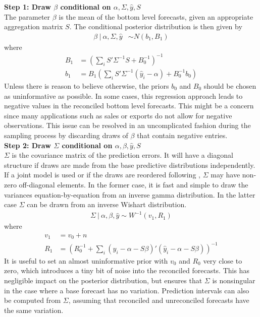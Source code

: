 \documentclass[a4paper,fleqn,11pt]{article}
\begin{document}
\noindent\textbf{Step 1: Draw $\beta$ conditional on $\alpha,\Sigma,\hat{y},S$}\\
The parameter $\beta$ is the mean of the bottom level forecasts, given an appropriate aggregation matrix $S$. The conditional posterior distribution is then given by
\begin{align}
\beta\ |\ \alpha,\Sigma,\hat{y} &\sim N(b_1,B_1)
\end{align}
where
\begin{align*}
B_1 &= \left(\sum_i S'\Sigma^{-1}S + B_0^{-1}\right)^{-1} \\
b_1 &= B_1 \left(\sum_i S'\Sigma^{-1} (\hat{y}_i - \alpha) + B_0^{-1}b_0\right)
\end{align*}
Unless there is reason to believe otherwise, the priors $b_0$ and $B_0$ should be chosen as uninformative as possible. In some cases, this regression approach leads to negative values in the reconciled bottom level forecasts. This might be a concern since many applications such as sales or exports do not allow for negative observations. This issue can be resolved in an uncomplicated fashion during the sampling process by discarding draws of $\beta$ that contain negative entries.\\

\noindent\textbf{Step 2: Draw $\Sigma$ conditional on $\alpha,\beta,\hat{y},S$}\\
$\Sigma$ is the covariance matrix of the prediction errors. It will have a diagonal structure if draws are made from the base predictive distributions independently.  If a joint model is used or if the draws are reordered following \cite{Jeon2018}, $\Sigma$ may have non-zero off-diagonal elements. In the former case, it is fast and simple to draw the variances equation-by-equation from an inverse gamma distribution.  In the latter case $\Sigma$ can be drawn from an inverse Wishart distribution.
\begin{align}
\Sigma\ |\ \alpha,\beta,\hat{y} \sim W^{-1}(v_1,R_1)
\end{align}
where
\begin{align*}
v_1 &= v_0 + n\\
R_1 &=  \left( R_0^{-1} + \sum_i (\hat{y}_i - \alpha - S \beta)'(\hat{y}_i - \alpha - S \beta) \right)^{-1}
\end{align*}
It is useful to set an almost uninformative prior with $v_0$ and $R_0$ very close to zero, which introduces a tiny bit of noise into the reconciled forecasts. This has negligible impact on the posterior distribution, but ensures that $\Sigma$ is nonsingular in the case where a base forecast has no variation. Prediction intervals can also be computed from $\Sigma$, assuming that reconciled and unreconciled forecasts have the same variation.
\end{document}
